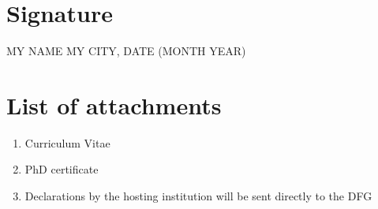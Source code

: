 \documentclass[a4paper,11pt]{article}
\begin{document}
\section{Signature}

\hspace*{75pt} MY NAME \hfill MY CITY, DATE (MONTH YEAR)

\section{List of attachments}

\begin{enumerate}
  \item Curriculum Vitae
  \item PhD certificate
  \item Declarations by the hosting institution will be sent directly to the DFG
\end{enumerate}

\vfill
\end{document}
